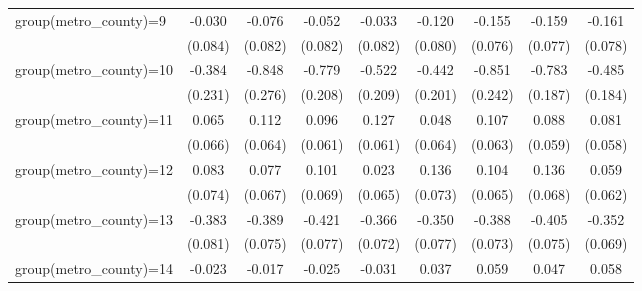 {\begin{tabular}{l*{8}{c}}
group(metro\_county)=9&      -0.030         &      -0.076         &      -0.052         &      -0.033         &      -0.120         &      -0.155\sym{**} &      -0.159\sym{**} &      -0.161\sym{**} \\
                    &     (0.084)         &     (0.082)         &     (0.082)         &     (0.082)         &     (0.080)         &     (0.076)         &     (0.077)         &     (0.078)         \\
group(metro\_county)=10&      -0.384\sym{*}  &      -0.848\sym{***}&      -0.779\sym{***}&      -0.522\sym{**} &      -0.442\sym{**} &      -0.851\sym{***}&      -0.783\sym{***}&      -0.485\sym{**} \\
                    &     (0.231)         &     (0.276)         &     (0.208)         &     (0.209)         &     (0.201)         &     (0.242)         &     (0.187)         &     (0.184)         \\
group(metro\_county)=11&       0.065         &       0.112\sym{*}  &       0.096         &       0.127\sym{**} &       0.048         &       0.107\sym{*}  &       0.088         &       0.081         \\
                    &     (0.066)         &     (0.064)         &     (0.061)         &     (0.061)         &     (0.064)         &     (0.063)         &     (0.059)         &     (0.058)         \\
group(metro\_county)=12&       0.083         &       0.077         &       0.101         &       0.023         &       0.136\sym{*}  &       0.104         &       0.136\sym{**} &       0.059         \\
                    &     (0.074)         &     (0.067)         &     (0.069)         &     (0.065)         &     (0.073)         &     (0.065)         &     (0.068)         &     (0.062)         \\
group(metro\_county)=13&      -0.383\sym{***}&      -0.389\sym{***}&      -0.421\sym{***}&      -0.366\sym{***}&      -0.350\sym{***}&      -0.388\sym{***}&      -0.405\sym{***}&      -0.352\sym{***}\\
                    &     (0.081)         &     (0.075)         &     (0.077)         &     (0.072)         &     (0.077)         &     (0.073)         &     (0.075)         &     (0.069)         \\
group(metro\_county)=14&      -0.023         &      -0.017         &      -0.025         &      -0.031         &       0.037         &       0.059         &       0.047         &       0.058         \\

\end{tabular}}
